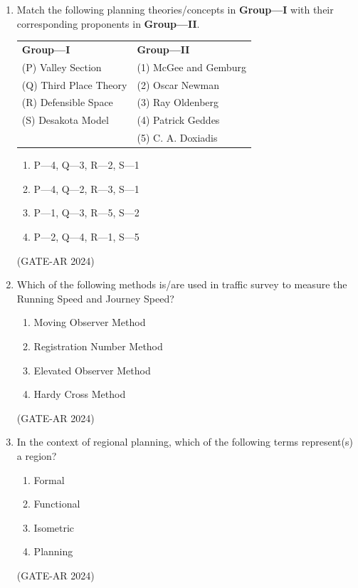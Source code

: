 \documentclass[a4paper,10pt]{article}
\begin{document}
\begin{enumerate}
    \item Match the following planning theories/concepts in \textbf{Group—I} with their corresponding proponents in \textbf{Group—II}. \\
    \begin{tabular}{ l l }
    \textbf{Group—I} & \textbf{Group—II} \\
    (P) Valley Section & (1) McGee and Gemburg \\
    (Q) Third Place Theory & (2) Oscar Newman \\
    (R) Defensible Space & (3) Ray Oldenberg \\
    (S) Desakota Model & (4) Patrick Geddes \\
    & (5) C. A. Doxiadis \\
    \end{tabular}
    \begin{multicols}{2}
    \begin{enumerate}
        \item P—4, Q—3, R—2, S—1
        \item P—4, Q—2, R—3, S—1
        \item P—1, Q—3, R—5, S—2
        \item P—2, Q—4, R—1, S—5
    \end{enumerate}
    \end{multicols}
    \hfill (GATE-AR 2024)

    \item Which of the following methods is/are used in traffic survey to measure the Running Speed and Journey Speed?
    \begin{multicols}{2}
    \begin{enumerate}
        \item Moving Observer Method
        \item Registration Number Method
        \item Elevated Observer Method
        \item Hardy Cross Method
    \end{enumerate}
    \end{multicols}
    \hfill (GATE-AR 2024)

    \item In the context of regional planning, which of the following terms represent(s) a region?
    \begin{multicols}{4}
    \begin{enumerate}
        \item Formal
        \item Functional
        \item Isometric
        \item Planning
    \end{enumerate}
    \end{multicols}
    \hfill (GATE-AR 2024)


\end{enumerate}
\end{document}
